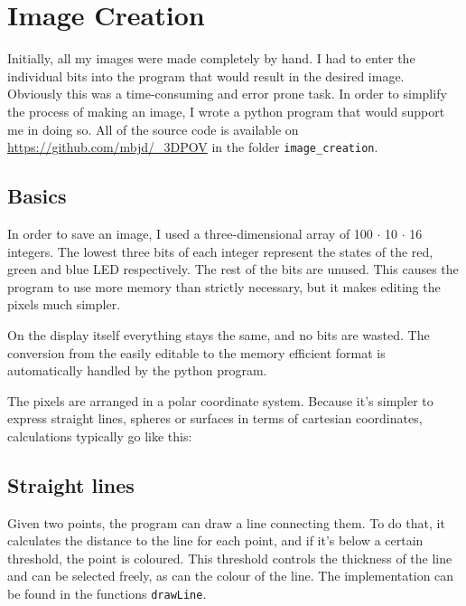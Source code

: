 \documentclass[a4paper, 11pt, titlepage]{report}
\begin{document}
\section{Image Creation}

Initially, all my images were made completely by hand. I had to enter the individual bits into the
program that would result in the desired image. Obviously this was a time-consuming and error
prone task. In order to simplify the process of making an image, I wrote a python program that
would support me in doing so. All of the source code is available on
\url{https://github.com/mbjd/\_3DPOV} in the folder \texttt{image\_creation}.

\subsection{Basics}

In order to save an image, I used a three-dimensional array of 100 $\cdot$ 10 $\cdot$ 16 integers.
The lowest three bits of each integer represent the states of the red, green and blue LED
respectively. The rest of the bits are unused. This causes the program to use more memory than
strictly necessary, but it makes editing the pixels much simpler.

On the display itself everything stays the same, and no bits are wasted. The conversion from the
easily editable to the memory efficient format is automatically handled by the python program.

The pixels are arranged in a polar coordinate system. Because it's simpler to express straight
lines, spheres or surfaces in terms of cartesian coordinates, calculations typically go like this:

\begin{algorithm}[H]
\end{algorithm}


\subsection{Straight lines}

Given two points, the program can draw a line connecting them. To do that, it calculates the
distance to the line for each point, and if it's below a certain threshold, the point is coloured.
This threshold controls the thickness of the line and can be selected freely, as can the colour of
the line. The implementation can be found in the functions \texttt{drawLine}.
\end{document}

